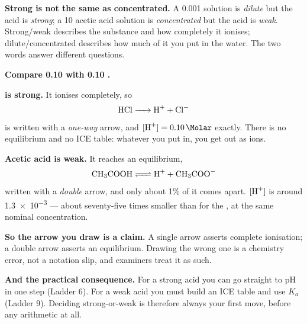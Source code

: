\documentclass{apchem-worksheet}
\begin{document}
\begin{apctrap}
\textbf{Strong is not the same as concentrated.} A
\SI{0.001}{\Molar}  solution is \emph{dilute} but the acid is
\emph{strong}; a \SI{10}{\Molar} acetic acid solution is
\emph{concentrated} but the acid is \emph{weak}. Strong/weak describes
the substance and how completely it ionises; dilute/concentrated
describes how much of it you put in the water. The two words answer
different questions.
\end{apctrap}

\begin{workedexample}
\textbf{Compare \SI{0.10}{\Molar}  with \SI{0.10}{\Molar}
.}

\textbf{ is strong.} It ionises completely, so
\[ \ce{HCl -> H+ + Cl-} \]
is written with a \emph{one-way} arrow, and $[\ce{H+}] =
\SI{0.10}{\Molar}$ exactly. There is no equilibrium and no ICE table:
whatever you put in, you get out as ions.

\textbf{Acetic acid is weak.} It reaches an equilibrium,
\[ \ce{CH3COOH <=> H+ + CH3COO-} \]
written with a \emph{double} arrow, and only about 1\% of it comes
apart. $[\ce{H+}]$ is around \SI{1.3e-3}{\Molar} --- about
seventy-five times smaller than for the , at the same nominal
concentration.

\textbf{So the arrow you draw is a claim.} A single arrow asserts
complete ionisation; a double arrow asserts an equilibrium. Drawing the
wrong one is a chemistry error, not a notation slip, and examiners treat
it as such.

\textbf{And the practical consequence.} For a strong acid you can go
straight to pH in one step (Ladder 6). For a weak acid you must build an
ICE table and use $K_{a}$ (Ladder 9). Deciding strong-or-weak is
therefore always your first move, before any arithmetic at all.
\end{workedexample}
\end{document}
